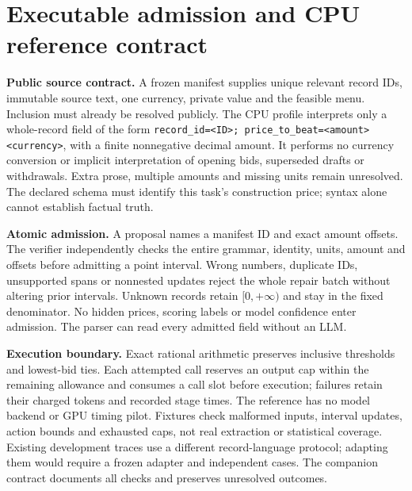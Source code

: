 \documentclass[sigconf,anonymous,nonacm]{acmart}
\begin{document}
\section{Executable admission and CPU reference contract}\label{app:admission}
\textbf{Public source contract.} A frozen manifest supplies unique relevant record IDs, immutable source text, one currency, private value and the feasible menu. Inclusion must already be resolved publicly. The CPU profile interprets only a whole-record field of the form \texttt{record\_id=<ID>; price\_to\_beat=<amount> <currency>}, with a finite nonnegative decimal amount. It performs no currency conversion or implicit interpretation of opening bids, superseded drafts or withdrawals. Extra prose, multiple amounts and missing units remain unresolved. The declared schema must identify this task's construction price; syntax alone cannot establish factual truth.

\textbf{Atomic admission.} A proposal names a manifest ID and exact amount offsets. The verifier independently checks the entire grammar, identity, units, amount and offsets before admitting a point interval. Wrong numbers, duplicate IDs, unsupported spans or nonnested updates reject the whole repair batch without altering prior intervals. Unknown records retain $[0,+\infty)$ and stay in the fixed denominator. No hidden prices, scoring labels or model confidence enter admission. The parser can read every admitted field without an LLM.

\textbf{Execution boundary.} Exact rational arithmetic preserves inclusive thresholds and lowest-bid ties. Each attempted call reserves an output cap within the remaining allowance and consumes a call slot before execution; failures retain their charged tokens and recorded stage times. The reference has no model backend or GPU timing pilot. Fixtures check malformed inputs, interval updates, action bounds and exhausted caps, not real extraction or statistical coverage. Existing development traces use a different record-language protocol; adapting them would require a frozen adapter and independent cases. The companion contract documents all checks and preserves unresolved outcomes.
\end{document}
